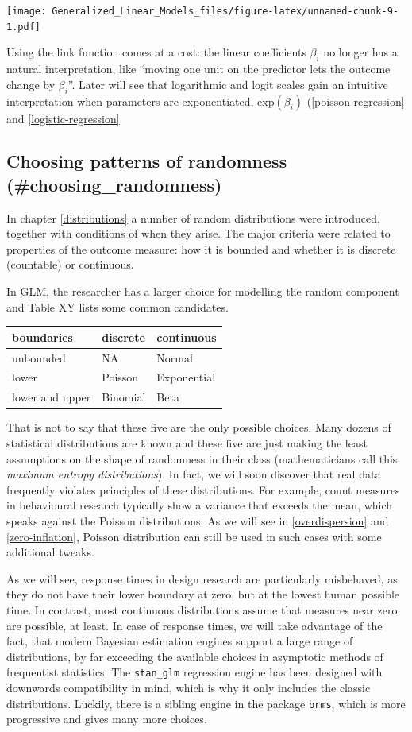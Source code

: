 \documentclass[]{svmono}
\theoremstyle{definition}
\theoremstyle{definition}
\theoremstyle{definition}
\theoremstyle{remark}
\begin{document}
\texttt{[image: Generalized\_Linear\_Models\_files/figure-latex/unnamed-chunk-9-1.pdf]}

Using the link function comes at a cost: the linear coefficients
\(\beta_i\) no longer has a natural interpretation, like ``moving one
unit on the predictor lets the outcome change by \(\beta_i\)''. Later
will see that logarithmic and logit scales gain an intuitive
interpretation when parameters are exponentiated,
\(\textrm{exp}(\beta_i)\) (\ref{poisson-regression} and
\ref{logistic-regression}

\subsection{Choosing patterns of randomness
(\#choosing\_randomness)}\label{choosing-patterns-of-randomness-choosing_randomness}

In chapter \ref{distributions} a number of random distributions were
introduced, together with conditions of when they arise. The major
criteria were related to properties of the outcome measure: how it is
bounded and whether it is discrete (countable) or continuous.

In GLM, the researcher has a larger choice for modelling the random
component and Table XY lists some common candidates.

\begin{tabular}{l|l|l}
\hline
boundaries & discrete & continuous\\
\hline
unbounded & NA & Normal\\
\hline
lower & Poisson & Exponential\\
\hline
lower and upper & Binomial & Beta\\
\hline
\end{tabular}

That is not to say that these five are the only possible choices. Many
dozens of statistical distributions are known and these five are just
making the least assumptions on the shape of randomness in their class
(mathematicians call this \emph{maximum entropy distributions}). In
fact, we will soon discover that real data frequently violates
principles of these distributions. For example, count measures in
behavioural research typically show a variance that exceeds the mean,
which speaks against the Poisson distributions. As we will see in
\ref{overdispersion} and \ref{zero-inflation}, Poisson distribution can
still be used in such cases with some additional tweaks.

As we will see, response times in design research are particularly
misbehaved, as they do not have their lower boundary at zero, but at the
lowest human possible time. In contrast, most continuous distributions
assume that measures near zero are possible, at least. In case of
response times, we will take advantage of the fact, that modern Bayesian
estimation engines support a large range of distributions, by far
exceeding the available choices in asymptotic methods of frequentist
statistics. The \texttt{stan\_glm} regression engine has been designed
with downwards compatibility in mind, which is why it only includes the
classic distributions. Luckily, there is a sibling engine in the package
\texttt{brms}, which is more progressive and gives many more choices.
\end{document}
